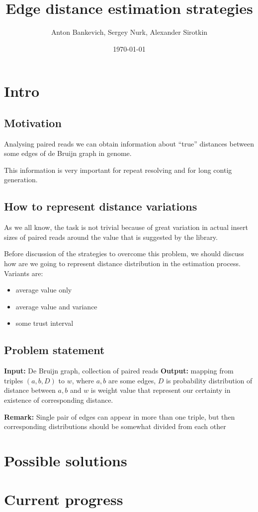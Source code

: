 \documentclass[12pt]{article}
\title{Edge distance estimation strategies}
\author{Anton Bankevich, Sergey Nurk, Alexander Sirotkin}
\date{\today}
\newcommand{\remark}[1]{\textbf{Remark:} #1}
\newcommand{\dbg}{de Bruijn graph}
\newcommand{\Dbg}{De Bruijn graph}
\begin{document}
\maketitle

\tableofcontents

\section{Intro}

\subsection{Motivation}
Analysing paired reads we can obtain information about ``true'' distances between some edges of \dbg{} in genome.

This information is very important for repeat resolving and for long contig generation.

\subsection{How to represent distance variations}
As we all know, the task is not trivial because of great variation in actual insert sizes of paired reads around the value that is suggested by the library.

Before discussion of the strategies to overcome this problem, we should discuss how are we going to represent distance distribution in the estimation process. 
Variants are:
\begin{itemize}
\item average value only
\item average value and variance
\item some trust interval
\end{itemize}

\subsection{Problem statement}

\textbf{Input:} \Dbg{}, collection of paired reads
\textbf{Output:} mapping from triples $(a,b,D)$ to $w$, where $a,b$ are some edges, $D$ is probability distribution of distance between $a,b$ and $w$ is weight value that represent our certainty in existence of corresponding distance.

\remark{Single pair of edges can appear in more than one triple, but then corresponding distributions should be somewhat divided from each other}


\section{Possible solutions}

\section{Current progress}
\end{document}
